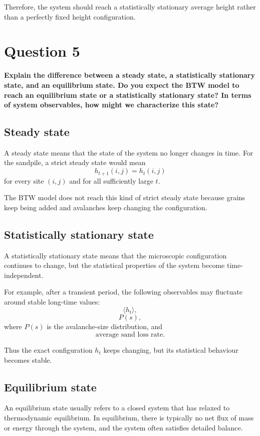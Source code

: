 Therefore, the system should reach a statistically stationary average height rather than a perfectly fixed height configuration.

\section*{Question 5}

\textbf{Explain the difference between a steady state, a statistically stationary state, and an equilibrium state. Do you expect the BTW model to reach an equilibrium state or a statistically stationary state? In terms of system observables, how might we characterize this state?}

\subsection*{Steady state}

A steady state means that the state of the system no longer changes in time. For the sandpile, a strict steady state would mean
\[
    h_{t+1}(i,j)=h_t(i,j)
\]
for every site $(i,j)$ and for all sufficiently large $t$.

The BTW model does not reach this kind of strict steady state because grains keep being added and avalanches keep changing the configuration.

\subsection*{Statistically stationary state}

A statistically stationary state means that the microscopic configuration continues to change, but the statistical properties of the system become time-independent.

For example, after a transient period, the following observables may fluctuate around stable long-time values:
\[
    \langle h_t\rangle,
\]
\[
    P(s),
\]
where $P(s)$ is the avalanche-size distribution, and
\[
    \text{average sand loss rate}.
\]

Thus the exact configuration $h_t$ keeps changing, but its statistical behaviour becomes stable.

\subsection*{Equilibrium state}

An equilibrium state usually refers to a closed system that has relaxed to thermodynamic equilibrium. In equilibrium, there is typically no net flux of mass or energy through the system, and the system often satisfies detailed balance.

